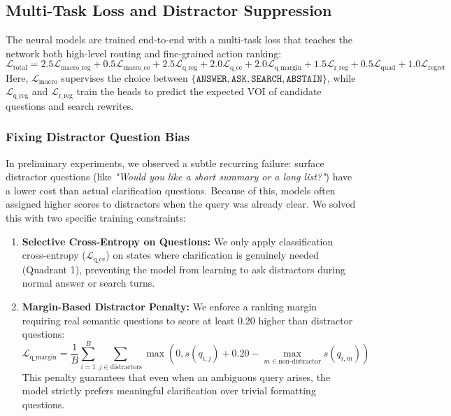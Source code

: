 \subsection{Multi-Task Loss and Distractor Suppression}
The neural models are trained end-to-end with a multi-task loss that teaches the network both high-level routing and fine-grained action ranking:
\begin{equation*}
    \mathcal{L}_{\text{total}} = 2.5 \mathcal{L}_{\text{macro\_reg}} + 0.5 \mathcal{L}_{\text{macro\_ce}} + 2.5 \mathcal{L}_{\text{q\_reg}} + 2.0 \mathcal{L}_{\text{q\_ce}} + 2.0 \mathcal{L}_{\text{q\_margin}} + 1.5 \mathcal{L}_{\text{r\_reg}} + 0.5 \mathcal{L}_{\text{quad}} + 1.0 \mathcal{L}_{\text{regret}}
\end{equation*}
Here, $\mathcal{L}_{\text{macro}}$ supervises the choice between $\{\texttt{ANSWER}, \texttt{ASK}, \texttt{SEARCH}, \texttt{ABSTAIN}\}$, while $\mathcal{L}_{\text{q\_reg}}$ and $\mathcal{L}_{\text{r\_reg}}$ train the heads to predict the expected VOI of candidate questions and search rewrites.

\subsubsection{Fixing Distractor Question Bias}
In preliminary experiments, we observed a subtle recurring failure: surface distractor questions (like \textit{"Would you like a short summary or a long list?"}) have a lower cost than actual clarification questions. Because of this, models often assigned higher scores to distractors when the query was already clear. We solved this with two specific training constraints:
\begin{enumerate}
    \item \textbf{Selective Cross-Entropy on Questions:} We only apply classification cross-entropy ($\mathcal{L}_{\text{q\_ce}}$) on states where clarification is genuinely needed (Quadrant 1), preventing the model from learning to ask distractors during normal answer or search turns.
    \item \textbf{Margin-Based Distractor Penalty:} We enforce a ranking margin requiring real semantic questions to score at least 0.20 higher than distractor questions:
    \begin{equation*}
        \mathcal{L}_{\text{q\_margin}} = \frac{1}{B} \sum_{i=1}^B \sum_{j \in \text{distractors}} \max\left(0, s(q_{i, j}) + 0.20 - \max_{m \in \text{non-distractor}} s(q_{i, m})\right)
    \end{equation*}
    This penalty guarantees that even when an ambiguous query arises, the model strictly prefers meaningful clarification over trivial formatting questions.
\end{enumerate}